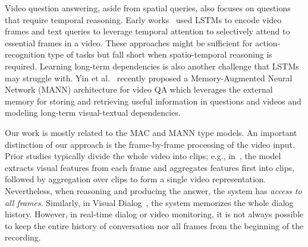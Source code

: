Video question answering, aside from spatial queries, also focuses on questions that require temporal reasoning. Early works~\cite{mun2017marioqa, xu2017video, yu2017end} used LSTMs to encode video frames and text queries to leverage temporal attention to selectively attend to essential frames in a video. These approaches might be sufficient for action-recognition type of tasks but fall short when spatio-temporal reasoning is required. Learning long-term dependencies is also another challenge that LSTMs may struggle with. Yin et al.~\cite{yin2019memory} recently proposed a Memory-Augmented Neural Network (MANN) architecture for video QA which leverages the external memory for storing and retrieving useful information in questions and videos and modeling long-term visual-textual dependencies.

Our work is mostly related to the MAC and MANN type models. An important distinction of our approach is the frame-by-frame processing of the video input. Prior studies typically divide the whole video into clips; e.g., in~\cite{song2018explore}, the model extracts visual features from each frame and aggregates features first into clips, followed by aggregation over clips to form a single video representation. Nevertheless, when reasoning and producing the answer, the system has \emph{access to all frames}. Similarly, in Visual Dialog~\cite{das2017visual}, the system memorizes the whole dialog history. However, in real-time dialog or video monitoring, it is not always possible to keep the entire history of conversation nor all frames from the beginning of the recording.

